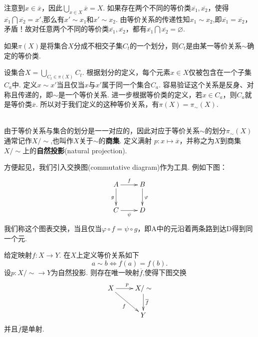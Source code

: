 \documentclass[color=green,mathpazo,titlestyle=hang]{elegantbook}
\begin{document}
\begin{newproof}
	注意到$x\in \overline{x}$，因此$\bigcup_{x\in X}\overline{x}=X$. 如果存在两个不同的等价类$\overline{x_1},\overline{x_2}$，使得$\overline{x_1}\bigcap\overline{x_2}=x'$,那么有$x'\sim x_1$和$x'\sim x_2$. 由等价关系的传递性知$x_1\sim x_2$,即$\overline{x_1}=\overline{x_2}$，矛盾！故对任意两个不同的等价类$\overline{x_1},\overline{x_2}$，都有$\overline{x_1}\bigcap\overline{x_2}=\varnothing.$
\end{newproof}


\begin{newprop}
	如果$\pi(X)$是将集合$X$分成不相交子集$C_t$的一个划分，则$C_t$是由某一等价关系$\sim$确定的等价类.
\end{newprop}


\begin{newproof}
	设集合$X=\bigcup_{C_t\in\pi(X)}C_t$. 根据划分的定义，每个元素$x\in X$仅被包含在一个子集$C_a$中. 定义$x\sim x'$当且仅当$x$与$x'$属于同一个集合$C_a$. 容易验证这个关系是反身、对称且传递的，即$\sim$是一个等价关系. 进一步根据等价类的定义，若$x\in C_a$，则$C_a$就是等价类$\overline{x}$. 所以对于我们定义的这种等价关系，有$\pi(X)=\pi_{\sim}(X)$.
\end{newproof}

~\\
由于等价关系与集合的划分是一一对应的，因此对应于等价关系$\sim$的划分$\pi_{\sim}(X)$通常记作$X/\sim$,也叫作$X$关于$\sim$的\textbf{商集}. 定义满射
$p:x\longmapsto\overline{x}$，并称之为$X$到商集$X/\sim$上的\textbf{自然投影}(natural projection).

方便起见，我们引入交换图(commutative diagram)作为工具. 例如下图：
\[\xymatrix{
	A\ar[r]^{f}\ar[d]_{g} & B\ar[d]^{\varphi} \\
	C\ar[r]_{\psi}        & D 
}\]
我们称这个图表交换，当且仅当$\varphi\circ f = \psi\circ g$，即A中的元沿着两条路到达D得到同一个元.


\begin{newprop}
	给定映射$f:X\longrightarrow Y$. 在$X$上定义等价关系如下
	\[a\sim b \iff f(a) = f(b).\]
	设$p:X/\sim\longrightarrow Y$为自然投影. 则存在唯一映射$\overline{f}$,使得下图交换
    \[\xymatrix{
    	X\ar[r]^{p}\ar[dr]_{f} & X/\sim\ar[d]^{\overline{f}} \\
    	  & Y 
    }\]
    并且$\overline{f}$是单射.
\end{newprop}
\end{document}
